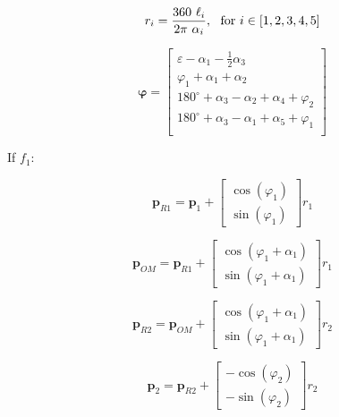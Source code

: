 \documentclass[10pt,a4paper]{article}
\begin{document}
\begin{multicols}{2}

\begin{equation}
r_i = \frac{360 ~ \ell_i}{2 \pi ~ \alpha_i},~~ \textnormal{for}~ i \in [1,2,3,4,5]
\label{eq:F1_start}
\end{equation}

\begin{equation}
\bm{\varphi} = \begin{bmatrix}
\varepsilon - \alpha_1 - \frac{1}{2}\alpha_3 \\
\varphi_1 + \alpha_1 + \alpha_2 \\
180^\circ + \alpha_3 - \alpha_2 + \alpha_4 + \varphi_2 \\
180^\circ + \alpha_3 - \alpha_1 + \alpha_5 + \varphi_1 \\
\end{bmatrix}
\label{eq:phi_calc}
\end{equation}

If $f_1$:

\begin{equation}
\bm{p}_{R1} = \bm{p}_1 + 
\begin{bmatrix} 
\cos(\varphi_1)\\ 
\sin(\varphi_1)\end{bmatrix} r_1
\end{equation}

\begin{equation}
\bm{p}_{OM} = \bm{p}_{R1} + \begin{bmatrix} 
\cos(\varphi_1 + \alpha_1) \\ 
\sin(\varphi_1 + \alpha_1)
\end{bmatrix} r_1
\end{equation}

\begin{equation}
\bm{p}_{R2} = \bm{p}_{OM} + 
\begin{bmatrix} 
\cos(\varphi_1 + \alpha_1) \\ 
\sin(\varphi_1 + \alpha_1)
\end{bmatrix} r_2
\end{equation}

\begin{equation}
\bm{p}_{2} = \bm{p}_{R2} + 
\begin{bmatrix} 
-\cos(\varphi_2) \\ 
-\sin(\varphi_2)
\end{bmatrix} r_2
\end{equation}




\end{multicols}
\end{document}
